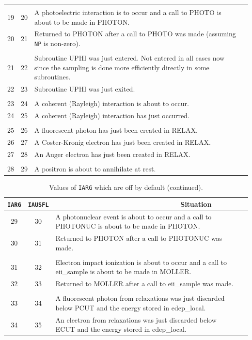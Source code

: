 \begin{table}[htbp]
\begin{center}
\begin{tabular}{ c c   p{125mm}l }
&&\\
19&20& A photoelectric interaction is to occur and a call
             to PHOTO is about to be made in PHOTON.\\
20&21& Returned to PHOTON after a call to PHOTO was made
             (assuming {\tt NP} is non-zero).\\
&&\\
21&22& Subroutine UPHI was just entered. Not entered in
all cases now since the sampling is done more efficiently directly in some
subroutines.\\
22&23& Subroutine UPHI was just exited.\\
&&\\
23&24& A coherent (Rayleigh) interaction is about to occur.\\
24&25& A coherent (Rayleigh) interaction has just occurred.\\
&&\\
25 &26& A fluorescent photon has just been created in RELAX.\\
26 & 27& A Coster-Kronig electron has just been created in RELAX.\\
27 &28& An Auger electron has just been created in RELAX.\\
&&\\
28 &29& A positron is about to annihilate at rest.\\
\hline
\end{tabular}
\end{center}
\end{table}

\begin{table}[htbp]
    \begin{center}
    \caption{Values of {\tt IARG} which are off by default (continued).}
     \vspace*{2mm}
    \begin{tabular}{ c c   p{125mm}l }
    \hline
    {\tt IARG} & {\tt IAUSFL} & ~~~~~~~~~~~~~~~~~~~~~~~~~~~~~~~~Situation \\
    \hline
29 &30& A photonuclear event is about to occur and a call
            to PHOTONUC is about to be made in PHOTON.\\
30 &31& Returned to PHOTON after a call to PHOTONUC was made.\\
&&\\
31 &32& Electron impact ionization is about to occur and a call
            to eii\_sample is about to be made in MOLLER.\\
32 &33& Returned to MOLLER after a call to eii\_sample was made.\\
&&\\
33 &34& A fluorescent photon from relaxations was just discarded below
            PCUT and the energy stored in edep\_local.\\
34 &35& An electron from relaxations was just discarded below
            ECUT and the energy stored in edep\_local.\\
\hline
\end{tabular}
\end{center}
\end{table}

